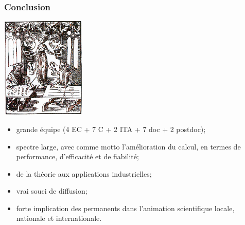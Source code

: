 \documentclass[mathsans]{beamer}
\begin{document}
\begin{frame}
\frametitle{Conclusion}
\begin{minipage}{4.2cm}\includegraphics[width=4cm]{Figures/DameArithmetique.PDF}\end{minipage}
\begin{minipage}{7.5cm} 
\begin{itemize}
    \item \alert{grande équipe} (4 EC + 7 C + 2 ITA + 7 doc + 2 postdoc);
    \item spectre large, avec comme motto \alert{l'amélioration du calcul,} en termes de performance, d'efficacité et de fiabilité;
    \item de la \alert{théorie} aux \alert{applications industrielles;}
    \item vrai souci de \alert{diffusion;}
     \item forte implication des permanents dans \alert{l'animation scientifique} locale, nationale et internationale.

\end{itemize}
\end{minipage}
\end{frame}
\end{document}
